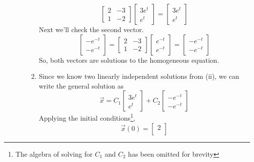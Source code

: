 \begin{enumerate}[label=\arabic*.]
\begin{enumerate}[label=(\alph*)]
\begin{enumerate}[label=(\roman*)]
\begin{equation*}
\begin{bmatrix}
									2 & -3 \\
									1 & -2
								\end{bmatrix} \begin{bmatrix}
									3e^t \\
									e^t
								\end{bmatrix} = \begin{bmatrix}
									3e^t \\
									e^t
								\end{bmatrix}
							\end{equation*}
							Next we'll check the second vector.
							\begin{equation*}
								\begin{bmatrix}
									-e^{-t} \\
									-e^{-t}
								\end{bmatrix} = \begin{bmatrix}
									2 & -3 \\
									1 & -2
								\end{bmatrix} \begin{bmatrix}
									e^{-t} \\
									e^{-t}
								\end{bmatrix} = \begin{bmatrix}
									-e^{-t} \\
									-e^{-t}
								\end{bmatrix} 
							\end{equation*}
							So, both vectors are solutions to the homogeneous equation.
						\item
							Since we know two linearly independent solutions from (ii), we can write the general solution as
							\begin{equation*}
								\vec{x} = C_1 \begin{bmatrix}
									3e^t \\
									e^t
								\end{bmatrix} + C_2 \begin{bmatrix}
									-e^{-t} \\
									-e^{-t}
								\end{bmatrix} 
							\end{equation*}
							Applying the initial conditions\footnote{The algebra of solving for $C_1$ and $C_2$ has been omitted for brevity},
							\begin{equation*}
								\vec{x}(0) = \begin{bmatrix}
									2 \\

\end{bmatrix}
\end{equation*}
\end{enumerate}
\end{enumerate}
\end{enumerate}

